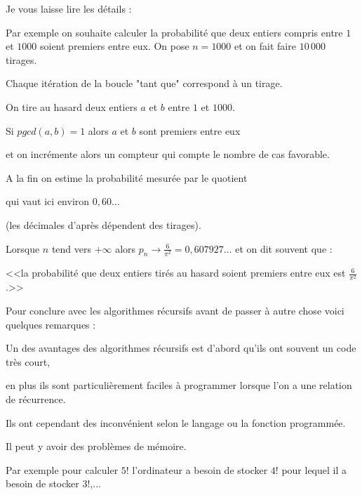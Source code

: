 Je vous laisse lire les détails :

\change

Par exemple on souhaite calculer la probabilité que deux entiers compris entre $1$ et $1000$
soient premiers entre eux. On pose $n=1000$ et on fait faire $10 \, 000$ tirages.

Chaque itération de la boucle "tant que" correspond à un tirage.

On tire au hasard deux entiers $a$ et $b$ entre $1$ et $1000$.

Si $pgcd(a,b)=1$ alors $a$ et $b$ sont premiers entre eux

et on incrémente alors un compteur qui compte le nombre de cas favorable. 

\change

A la fin on estime la probabilité
mesurée par le quotient 

 qui vaut ici environ  $0,60\ldots$ 

(les décimales d'après dépendent des tirages).


\change

Lorsque $n$ tend vers $+\infty$ alors $p_n \to \frac{6}{\pi^2} = 0,607927\ldots$ et on dit souvent que :


\change


<<la probabilité que deux entiers tirés au hasard soient premiers entre eux est $\frac{6}{\pi^2}$.>>



\diapo


Pour conclure avec les algorithmes récursifs avant de passer à autre chose voici quelques remarques :

\change

Un des avantages des algorithmes récursifs est d'abord
qu'ils ont souvent un code très court,

\change

en plus ils sont particulièrement faciles à programmer lorsque l'on a une relation de récurrence.

\change

Ils ont cependant des inconvénient selon le langage ou la fonction programmée.

Il peut y avoir des problèmes de mémoire.

Par exemple pour calculer $5!$ l'ordinateur a besoin de stocker $4!$ pour lequel il a besoin de stocker $3!$,...



